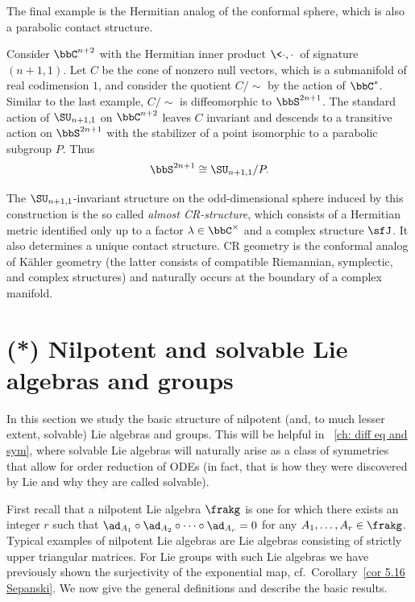 The final example is the Hermitian analog of the conformal sphere, which is also a parabolic contact structure.

\begin{example}[CR-sphere]
    Consider $\bbC^{n+2}$ with the Hermitian inner product $\<\cdot,\cdot\>$ of signature $(n+1,1)$. Let $C$ be the cone of nonzero null vectors, which is a submanifold of real codimension $1$, and consider the quotient $C\slash \sim$ by the action of $\bbC^\ast$. Similar to the last example, $C\slash \sim$ is diffeomorphic to $\bbS^{2n+1}$. The standard action of $\SU_{n+1,1}$ on $\bbC^{n+2}$ leaves $C$ invariant and descends to a transitive action on $\bbS^{2n+1}$ with the stabilizer of a point isomorphic to a parabolic subgroup $P$. Thus 
    \[\bbS^{2n+1}\cong \SU_{n+1,1}\slash P.\]
\end{example}

The $\SU_{n+1,1}$-invariant structure on the odd-dimensional sphere induced by this construction is the so called \emph{almost CR-structure}, which consists of a Hermitian metric identified only up to a factor $\lambda\in\bbC^\times$ and a complex structure $\sfJ$. It also determines a unique contact structure. CR geometry is the conformal analog of K\"ahler geometry (the latter consists of compatible Riemannian, symplectic, and complex structures) and naturally occurs at the boundary of a complex manifold.











\section{(*) Nilpotent and solvable Lie algebras and groups}\label{sec: nilpotent groups}

In this section we study the basic structure of nilpotent (and, to much lesser extent, solvable) Lie algebras and groups. This will be helpful in \Chap~\ref{ch: diff eq and sym}, where solvable Lie algebras will naturally arise as a class of symmetries that allow for order reduction of ODEs (in fact, that is how they were discovered by Lie and why they are called solvable).  

First recall that a nilpotent Lie algebra $\frakg$ is one for which there exists an integer $r$ such that $\ad_{A_1}\circ\ad_{A_2}\circ\cdots\circ\ad_{A_r}=0$ for any $A_1,\ldots,A_r\in\frakg$. Typical examples of nilpotent Lie algebras are Lie algebras consisting of strictly upper triangular matrices. For Lie groups with such Lie algebras we have previously shown the surjectivity of the exponential map, cf.\ Corollary~\ref{cor 5.16 Sepanski}. We now give the general definitions and describe the basic results.

